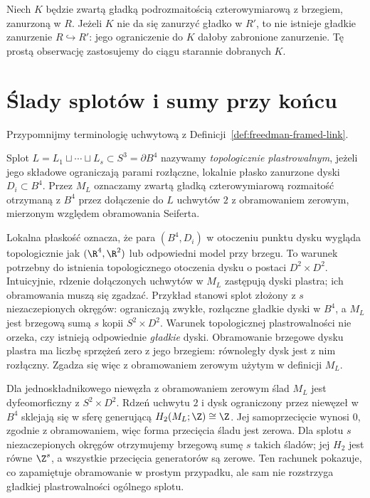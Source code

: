 Niech $K$ będzie zwartą gładką podrozmaitością
czterowymiarową z brzegiem, zanurzoną w $R$.
Jeżeli $K$ nie da się zanurzyć gładko w $R'$, to
nie istnieje gładkie zanurzenie $R\hookrightarrow R'$:
jego ograniczenie do $K$ dałoby zabronione
zanurzenie. Tę prostą obserwację zastosujemy do
ciągu starannie dobranych $K$.

\section{Ślady splotów i sumy przy końcu}
\label{sec:egzotyczne-r4-sploty}

Przypomnijmy terminologię uchwytową z
Definicji~\ref{def:freedman-framed-link}.

\begin{definicja}
\label{def:egzotyczne-r4-slice}
Splot $L=L_1\sqcup\cdots\sqcup L_s\subset S^3=\partial B^4$
nazywamy \emph{topologicznie plastrowalnym}, jeżeli
jego składowe ograniczają parami rozłączne,
lokalnie płasko zanurzone dyski $D_i\subset B^4$.
Przez $M_L$ oznaczamy zwartą gładką
czterowymiarową rozmaitość otrzymaną z $B^4$
przez dołączenie do $L$ uchwytów $2$ z obramowaniem
zerowym, mierzonym względem obramowania Seiferta.
\end{definicja}

Lokalna płaskość oznacza, że para $(B^4,D_i)$
w otoczeniu punktu dysku wygląda topologicznie
jak $(\R^4,\R^2)$ lub odpowiedni model przy brzegu.
To warunek potrzebny do istnienia topologicznego
otoczenia dysku o postaci $D^2\times D^2$.
Intuicyjnie, rdzenie dołączonych uchwytów w $M_L$
zastępują dyski plastra; ich obramowania muszą
się zgadzać. Przykład stanowi splot złożony z $s$
niezaczepionych okręgów: ograniczają zwykłe,
rozłączne gładkie dyski w $B^4$, a $M_L$ jest
brzegową sumą $s$ kopii $S^2\times D^2$.
Warunek topologicznej plastrowalności nie orzeka,
czy istnieją odpowiednie \emph{gładkie} dyski.
Obramowanie brzegowe dysku plastra ma liczbę
sprzężeń zero z jego brzegiem: równoległy dysk
jest z nim rozłączny. Zgadza się więc z
obramowaniem zerowym użytym w definicji $M_L$.

\begin{przyklad}
\label{prz:egzotyczne-r4-unlink}
Dla jednoskładnikowego niewęzła z obramowaniem
zerowym ślad $M_L$ jest dyfeomorficzny z
$S^2\times D^2$. Rdzeń uchwytu $2$ i dysk
ograniczony przez niewęzeł w $B^4$ sklejają się
w sferę generującą $H_2(M_L;\Z)\cong\Z$.
Jej samoprzecięcie wynosi $0$, zgodnie z
obramowaniem, więc forma przecięcia śladu jest
zerowa. Dla splotu $s$ niezaczepionych okręgów
otrzymujemy brzegową sumę $s$ takich śladów;
jej $H_2$ jest równe $\Z^s$, a wszystkie
przecięcia generatorów są zerowe. Ten rachunek
pokazuje, co zapamiętuje obramowanie w prostym
przypadku, ale sam nie rozstrzyga gładkiej
plastrowalności ogólnego splotu.
\end{przyklad}


